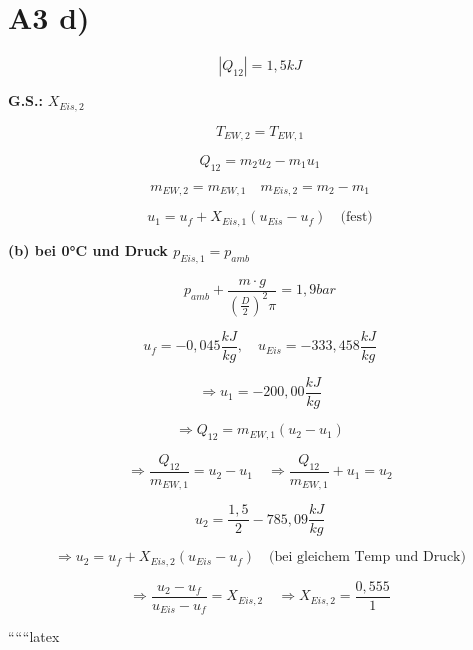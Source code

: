 \section*{A3 d)}

\[
\left|Q_{12}\right| = 1,5 kJ
\]

\textbf{G.S.:} $X_{Eis,2}$

\[
T_{EW,2} = T_{EW,1}
\]

\[
Q_{12} = m_2 u_2 - m_1 u_1
\]

\[
m_{EW,2} = m_{EW,1} \quad m_{Eis,2} = m_2 - m_1
\]

\[
u_1 = u_f + X_{Eis,1} (u_{Eis} - u_f) \quad \text{(fest)}
\]

\textbf{(b) bei 0°C und Druck $p_{Eis,1} = p_{amb}$}

\[
p_{amb} + \frac{m \cdot g}{\left(\frac{D}{2}\right)^2 \pi} = 1,9 bar
\]

\[
u_f = -0,045 \frac{kJ}{kg}, \quad u_{Eis} = -333,458 \frac{kJ}{kg}
\]

\[
\Rightarrow u_1 = -200,00 \frac{kJ}{kg}
\]

\[
\Rightarrow Q_{12} = m_{EW,1} (u_2 - u_1)
\]

\[
\Rightarrow \frac{Q_{12}}{m_{EW,1}} = u_2 - u_1 \quad \Rightarrow \frac{Q_{12}}{m_{EW,1}} + u_1 = u_2
\]

\[
u_2 = \frac{1,5}{2} - 785,09 \frac{kJ}{kg}
\]

\[
\Rightarrow u_2 = u_f + X_{Eis,2} (u_{Eis} - u_f) \quad \text{(bei gleichem Temp und Druck)}
\]

\[
\Rightarrow \frac{u_2 - u_f}{u_{Eis} - u_f} = X_{Eis,2} \quad \Rightarrow X_{Eis,2} = \frac{0,555}{1}
\]

``````latex


